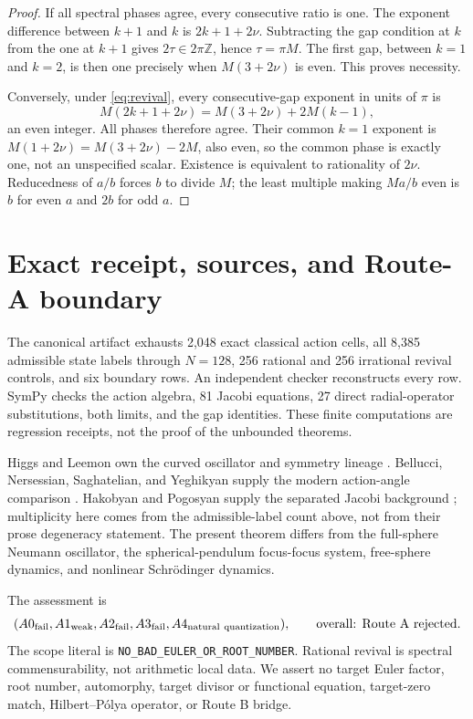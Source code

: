 \documentclass[10pt]{article}
\newcommand{\ZZ}{\mathbb Z}
\begin{document}
\begin{proof}
If all spectral phases agree, every consecutive ratio is one.  The exponent
difference between $k+1$ and $k$ is $2k+1+2\nu$.  Subtracting the gap
condition at $k$ from the one at $k+1$ gives
$2\tau\in2\pi\ZZ$, hence $\tau=\pi M$.  The first gap, between $k=1$ and
$k=2$, is then one precisely when $M(3+2\nu)$ is even.  This proves
necessity.

Conversely, under \eqref{eq:revival}, every consecutive-gap exponent in
units of $\pi$ is
\[
 M(2k+1+2\nu)=M(3+2\nu)+2M(k-1),
\]
an even integer.  All phases therefore agree.  Their common $k=1$ exponent
is $M(1+2\nu)=M(3+2\nu)-2M$, also even, so the common phase is exactly one,
not an unspecified scalar.  Existence is equivalent to rationality of
$2\nu$.  Reducedness of $a/b$ forces $b$ to divide $M$; the least multiple
making $Ma/b$ even is $b$ for even $a$ and $2b$ for odd $a$.
\end{proof}

\section{Exact receipt, sources, and Route-A boundary}
The canonical artifact exhausts 2,048 exact classical action cells, all
8,385 admissible state labels through $N=128$, 256 rational and 256
irrational revival controls, and six boundary rows.  An independent checker
reconstructs every row.  SymPy checks the action algebra, 81 Jacobi equations,
27 direct radial-operator substitutions, both limits, and the gap identities.
These finite computations are regression receipts, not the proof of the
unbounded theorems.

Higgs and Leemon own the curved oscillator and symmetry lineage
\cite{Higgs,Leemon}.  Bellucci, Nersessian, Saghatelian, and Yeghikyan supply
the modern action-angle comparison \cite{BNSY}.  Hakobyan and Pogosyan supply
the separated Jacobi background \cite{HP}; multiplicity here comes from the
admissible-label count above, not from their prose degeneracy statement.
The present theorem differs from the full-sphere Neumann oscillator, the
spherical-pendulum focus-focus system, free-sphere dynamics, and nonlinear
Schr\"odinger dynamics.

The assessment is
\[
 (A0_{\rm fail},A1_{\rm weak},A2_{\rm fail},A3_{\rm fail},
 A4_{\rm natural\ quantization}),
 \qquad \text{overall: Route A rejected}.
\]
The scope literal is \texttt{NO\_BAD\_EULER\_OR\_ROOT\_NUMBER}.  Rational
revival is spectral commensurability, not arithmetic local data.  We assert no
target Euler factor, root number, automorphy, target divisor or functional
equation, target-zero match, Hilbert--P\'olya operator, or Route B bridge.
\fi
\end{document}

